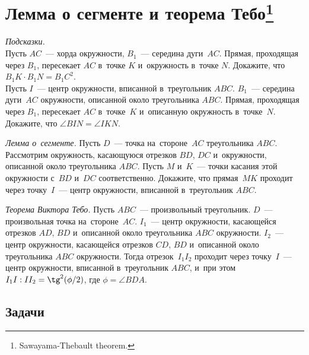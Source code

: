 

\section*{Лемма о сегменте и теорема Тебо\footnote{Sawayama-Thebault theorem.}}


\begin{problems}

\item
\emph{Подсказки.}
\\
\subproblem
Пусть $AC$~--- хорда окружности, $B_1$~--- середина дуги~$AC$.
Прямая, проходящая через $B_1$, пересекает $AC$ в~точке $K$ и~окружность
в~точке $N$.
Докажите, что $B_1 K \cdot B_1 N = {B_1 C}^2$.
\\
\subproblem
Пусть $I$~--- центр окружности, вписанной в~треугольник $ABC$.
$B_1$~--- середина дуги~$AC$ окружности, описанной около треугольника $ABC$.
Прямая, проходящая через $B_1$, пересекает $AC$ в~точке~$K$ и~описанную
окружность в~точке~$N$.
Докажите, что $\angle BIN = \angle IKN$.

\item\emph{Лемма о~сегменте.}
Пусть $D$~--- точка на~стороне~$AC$ треугольника $ABC$.
Рассмотрим окружность, касающуюся отрезков $BD$, $DC$ и~окружности, описанной
около треугольника $ABC$.
Пусть $M$ и~$K$~--- точки касания этой окружности с~$BD$ и~$DC$ соответственно.
Докажите, что прямая~$MK$ проходит через точку~$I$~--- центр окружности,
вписанной в~треугольник $ABC$.

\item\emph{Теорема Виктора Тебо.}
Пусть $ABC$~--- произвольный треугольник.
$D$~--- произвольная точка на~стороне~$AC$.
$I_1$~--- центр окружности, касающейся отрезков $AD$, $BD$ и~описанной около
треугольника $ABC$ окружности.
$I_2$~--- центр окружности, касающейся отрезков $CD$, $BD$ и~описанной около
треугольника $ABC$ окружности.
Тогда отрезок~$I_1 I_2$ проходит через точку~$I$~--- центр окружности,
вписанной в~треугольник $ABC$, и~при этом
$I_1 I : I I_2 = \tg^2(\phi / 2)$, где $\phi = \angle BDA$.

\end{problems}

\subsection*{Задачи}

